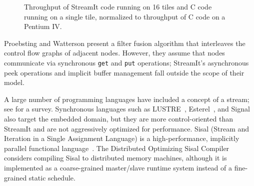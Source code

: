 \begin{figure}
\centering
{}
\vspace{-6pt}
\caption{Throughput of StreamIt code running on 16 tiles and C code
running on a single tile, normalized to throughput of C code on a
Pentium IV. \protect\label{fig:compare-pentium}}
\vspace{-12pt}
\end{figure}

Proebsting and Watterson \cite{pro96} present a filter fusion
algorithm that interleaves the control flow graphs of adjacent nodes.
However, they assume that nodes communicate via synchronous {\tt get}
and {\tt put} operations; StreamIt's asynchronous peek operations and
implicit buffer management fall outside the scope of their model.

A large number of programming languages have included a concept of a
stream; see \cite{survey97} for a survey.  Synchronous languages such
as LUSTRE~\cite{lustre}, Esterel~\cite{esterel92}, and
Signal~\cite{signal} also target the embedded domain, but they are
more control-oriented than StreamIt and are not aggressively optimized
for performance.  Sisal (Stream and Iteration in a Single Assignment
Language) is a high-performance, implicitly parallel functional
language~\cite{sisal}.  The Distributed Optimizing Sisal
Compiler~\cite{sisal} considers compiling Sisal to distributed memory
machines, although it is implemented as a coarse-grained master/slave
runtime system instead of a fine-grained static schedule.

